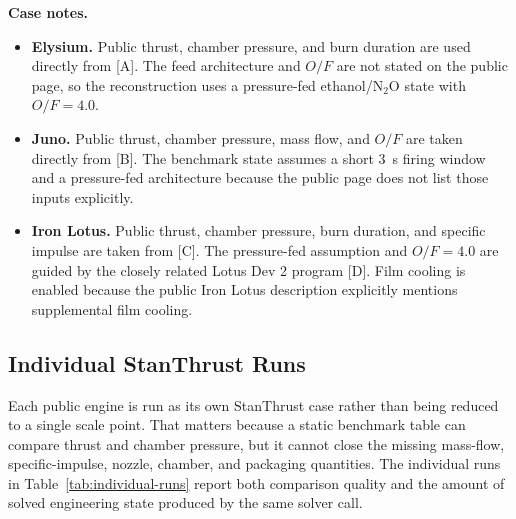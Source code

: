 \documentclass[11pt]{article}
\begin{document}
\noindent\textbf{Case notes.}
\begin{itemize}[leftmargin=5mm]
\item \textbf{Elysium.} Public thrust, chamber pressure, and burn duration are used directly from [A]. The feed architecture and $O/F$ are not stated on the public page, so the reconstruction uses a pressure-fed ethanol/N$_2$O state with $O/F=4.0$.
\item \textbf{Juno.} Public thrust, chamber pressure, mass flow, and $O/F$ are taken directly from [B]. The benchmark state assumes a short \SI{3}{s} firing window and a pressure-fed architecture because the public page does not list those inputs explicitly.
\item \textbf{Iron Lotus.} Public thrust, chamber pressure, burn duration, and specific impulse are taken from [C]. The pressure-fed assumption and $O/F=4.0$ are guided by the closely related Lotus Dev 2 program [D]. Film cooling is enabled because the public Iron Lotus description explicitly mentions supplemental film cooling.
\end{itemize}

\subsection*{Individual StanThrust Runs}
Each public engine is run as its own StanThrust case rather than being reduced to a single scale point. That matters because a static benchmark table can compare thrust and chamber pressure, but it cannot close the missing mass-flow, specific-impulse, nozzle, chamber, and packaging quantities. The individual runs in Table~\ref{tab:individual-runs} report both comparison quality and the amount of solved engineering state produced by the same solver call.

\begin{table}[H]
\centering
\caption{Individual reconstructed benchmark runs. The comparable-stat count includes thrust, chamber pressure, mass flow, and specific impulse when a public reference value is available. The solved-field count covers thrust, chamber pressure, mass flow, specific impulse, throat diameter, exit diameter, expansion ratio, chamber length, and total stack length.}
\label{tab:individual-runs}
\scriptsize
{}
\end{table}
\end{document}
